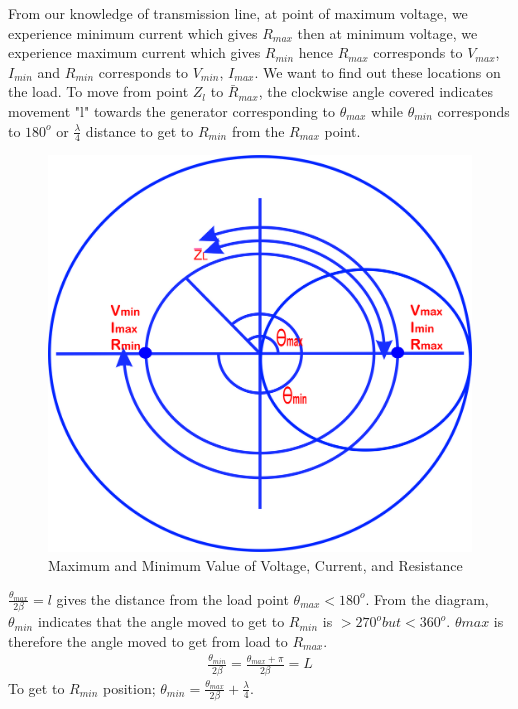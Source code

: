 From our knowledge of transmission line, at point of maximum voltage, we experience minimum current which gives $R_{max}$ then at minimum voltage, we experience maximum current which gives $R_{min}$ hence $R_{max}$ corresponds to $V_{max}$,  $I_{min}$ and  $R_{min}$ corresponds to  $V_{min}$, $I_{max}$.  We want to find out these locations on the load. To move from point $Z_{l}$ to $\bar{R}_{max}$, the clockwise angle covered indicates movement "l" towards the generator corresponding to $\theta_{max}$ while $\theta_{min}$ corresponds to $180^o$ or $\frac{\lambda}{4}$ distance to get to $R_{min}$ from the $R_{max}$ point.
\begin{figure}[h]
\centering
\includegraphics[width=0.6\linewidth]{./graphics/lkjtresx}
\caption{Maximum and Minimum Value of Voltage, Current, and Resistance}
\label{fig:lkjtresx}
\end{figure}

$\frac{\theta_{max}}{2\beta}=l$ gives the distance from the load point $\theta_{max} < 180^o$. From the diagram, $\theta_{min}$ indicates that the angle moved to get to $R_{min}$ is $>270^o but <360^o$. $\theta{max}$ is therefore the angle moved to get from load to $R_{max}$.
\begin{align}
\frac{\theta_{min}}{2\beta}=\frac{\theta_{max} + \pi}{2\beta} = L
\end{align}
To get to $R_{min}$ position; $\theta_{min} = \frac{\theta_{max}}{2\beta} + \frac{\lambda}{4}.$ 